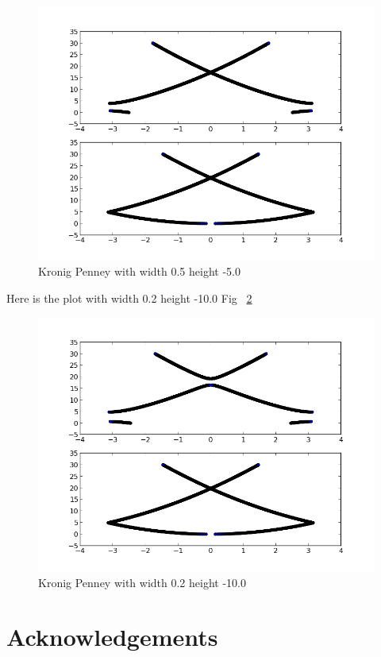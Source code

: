 \documentclass[11pt,letterpaper]{article}
\begin{document}
\begin{figure}
\begin{center}
\includegraphics[width=0.8\linewidth,angle=0]{kp0550.png}
\caption{Kronig Penney with width 0.5 height -5.0}
\label{figure10}
\end{center}
\end{figure}


Here is the plot with width 0.2 height -10.0 Fig ~\ref{figure11}


\begin{figure}
\begin{center}
\includegraphics[width=0.8\linewidth,angle=0]{kp0210.png}
\caption{Kronig Penney with width 0.2 height -10.0}
\label{figure11}
\end{center}
\end{figure}


\newpage
\section*{Acknowledgements}
\end{document}
